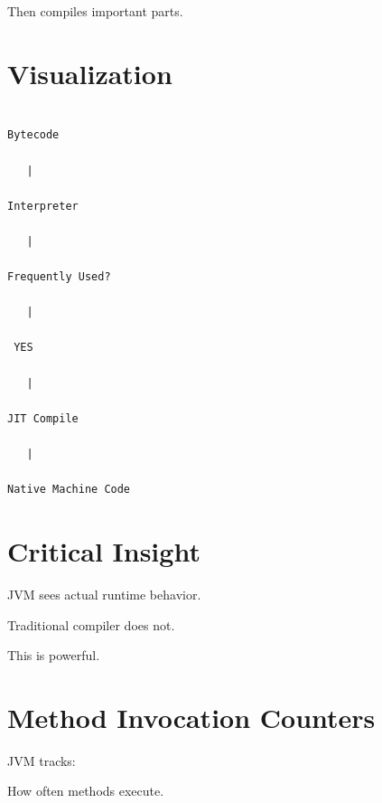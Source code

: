 \documentclass[11pt,a4paper]{book}
\begin{document}
Then compiles important parts.


\section{Visualization}

\begin{verbatim}

Bytecode

   |

Interpreter

   |

Frequently Used?

   |

 YES

   |

JIT Compile

   |

Native Machine Code

\end{verbatim}


\section{Critical Insight}

JVM sees actual runtime behavior.


Traditional compiler does not.


This is powerful.


\section{Method Invocation Counters}

JVM tracks:


How often methods execute.

\end{document}

